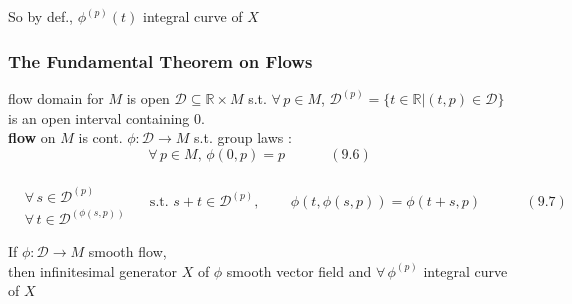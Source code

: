 So by def., $\phi^{(p)}(t)$ integral curve of $X$


\subsubsection*{ The Fundamental Theorem on Flows }

flow domain for $M$ is open $\mathcal{D} \subseteq \mathbb{R} \times M$ s.t. $\forall \, p \in M$, $\mathcal{D}^{(p)} = \lbrace t \in \mathbb{R} | (t,p) \in \mathcal{D} \rbrace$ is an open interval containing $0$.  \\

\textbf{flow} on $M$ is cont. $\phi : \mathcal{D} \to M$ s.t. group laws : 
\begin{equation}
  \forall \, p \in M, \, \phi(0, p ) = p \quad \quad \quad \, (9.6)
\end{equation}

\begin{equation}
  \begin{aligned} & \quad \\ 
    & \forall \, s \in \mathcal{D}^{(p)} \\ 
    & \forall \, t \in \mathcal{D}^{ (\phi(s,p))} \end{aligned} \quad \text{ s.t. } s + t \in \mathcal{D}^{(p)}, \quad \quad \, \phi(t, \phi(s,p) ) = \phi(t+s, p ) \quad \quad \quad \, (9.7)
\end{equation}

\begin{proposition}[9.11] If $\phi: \mathcal{D} \to M$ smooth flow, \\
then infinitesimal generator $X$ of $\phi$ smooth vector field and $\forall \, \phi^{(p)}$ integral curve of $X$
\end{proposition}

